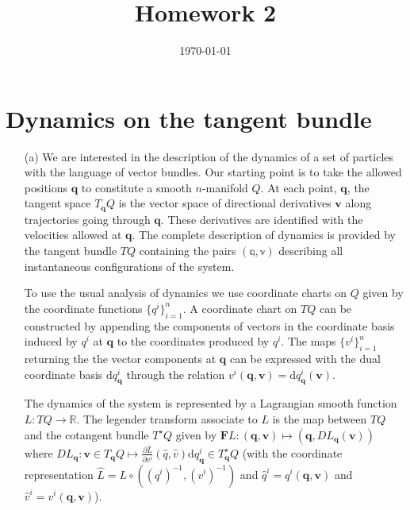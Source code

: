 \documentclass[10pt, a4paper]{article}
\title{Homework 2} %
\author{\PA} %
\date{\today} %
\begin{document}
\maketitlepage

\maketableofcontents


\footnotesize{

\section{Dynamics on the tangent bundle}

\begin{enumerate}
  \item[(a)] We are interested in the description of the dynamics of a set of particles with the language of vector bundles. Our starting point is to take the allowed positions $\mathbf{q}$ to constitute a smooth $n$-manifold $Q$. At each point, $\mathbf{q}$, the tangent space $T_{\mathbf{q}}Q$ is the vector space of directional derivatives $\mathbf{v}$ along trajectories going through $\mathbf{q}$. These derivatives are identified with the velocities allowed at $\mathbf{q}$. The complete description of dynamics is provided by the tangent bundle $TQ$ containing the pairs $(\mathbb{q}, \mathbb{v})$ describing all instantaneous configurations of the system.\medskip
  
  
  To use the usual analysis of dynamics we use coordinate charts on $Q$ given by the coordinate functions $\{q^{i}\}_{i = 1}^{n}$. A coordinate chart on $TQ$ can be constructed by appending the components of vectors in the coordinate basis induced by $q^{i}$ at $\mathbf{q}$ to the coordinates produced by $q^{i}$. The maps $\{v^i\}_{i = 1}^{n}$ returning the the vector components at $\mathbf{q}$ can be expressed with the dual coordinate basis $\text{d}q^{i}_\mathbf{q}$ through the relation $v^{i}(\mathbf{q}, \mathbf{v}) = \text{d}q^{i}_\mathbf{q} (\mathbf{v})$.\medskip
  
  The dynamics of the system is represented by a Lagrangian smooth function $L: TQ \to \mathbb{R}$. The legender transform associate to $L$ is the map between $TQ$ and the cotangent bundle $T^\star Q$ given by $\mathbf{F}L : (\mathbf{q}, \mathbf{v}) \mapsto (\mathbf{q}, DL_\mathbf{q}(\mathbf{v}))$ where $DL_\mathbf{q} : \mathbf{v} \in T_{\mathbf{q}} Q \mapsto \frac{\partial \hat{L}}{\partial v^i} (\hat{q}, \hat{v}) \text{d}q^{i}_{\mathbf{q}} \in T_\mathbf{q}^\star Q$ (with the coordinate representation $\hat{L} = L \circ ((q^i)^{-1}, (v^i)^{-1})$ and $\hat{q}^i = q^{i}(\mathbf{q}, \mathbf{v})$ and $\hat{v}^i = v^{i}(\mathbf{q}, \mathbf{v})$).\medskip 
  

\end{enumerate}}
\end{document}
